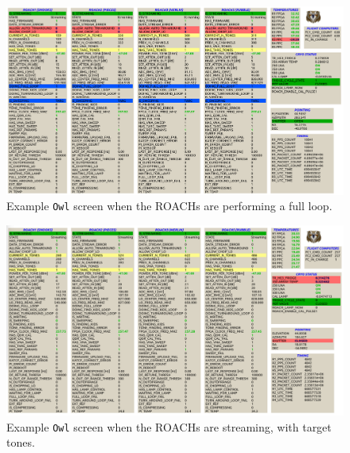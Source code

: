 \begin{figure}
\includegraphics[width=\linewidth,keepaspectratio]{./figures/software/full_loop}
\caption[~Example OWL screen when the ROACHs are performing a full loop.]{Example \texttt{Owl} screen when the ROACHs are performing a full loop.}
\label{fig:doing full loop screen}
\end{figure}

\begin{figure}
\includegraphics[width=\linewidth,keepaspectratio]{./figures/software/has_targ_tones}
\caption[~Example OWL screen when the ROACHs are streaming, with target tones.]{Example \texttt{Owl} screen when the ROACHs are streaming, with target tones.}
\label{fig:has targ tones screen}
\end{figure}

